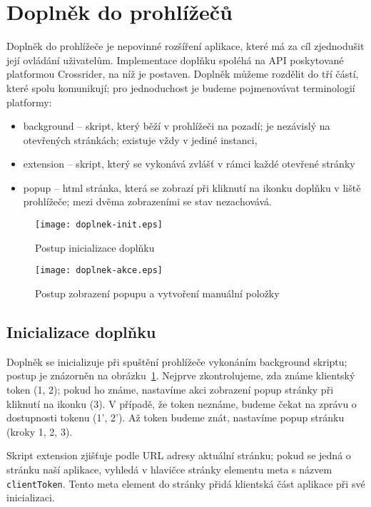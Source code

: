 \section{Doplněk do prohlížečů}

Doplněk do prohlížeče je nepovinné rozšíření aplikace, které má za cíl zjednodušit její ovládání uživatelům.
Implementace doplňku spoléhá na API poskytované platformou Crossrider, na níž je postaven.
Doplněk můžeme rozdělit do tří částí, které spolu komunikují; pro jednoduchost je budeme pojmenovávat terminologií platformy:
\begin{itemize}
	\item background -- skript, který běží v prohlížeči na pozadí; je nezávislý na otevřených stránkách; existuje vždy v jediné instanci,
	\item extension -- skript, který se vykonává zvlášť v rámci každé otevřené stránky
	\item popup -- html stránka, která se zobrazí při kliknutí na ikonku doplňku v liště prohlížeče; mezi dvěma zobrazeními se stav nezachovává.
\end{itemize}

\begin{figure}
	\centering
	\texttt{[image: doplnek-init.eps]}
	\caption{Postup inicializace doplňku}
	\label{fig:doplnek-init}
\end{figure}
\begin{figure}
	\centering
	\texttt{[image: doplnek-akce.eps]}
	\caption{Postup zobrazení popupu a vytvoření manuální položky}
	\label{fig:doplnek-akce}
\end{figure}

\subsection{Inicializace doplňku}

Doplněk se inicializuje při spuštění prohlížeče vykonáním background skriptu; postup je znázorněn na obrázku~\ref{fig:doplnek-init}.
Nejprve zkontrolujeme, zda známe klientský token (1, 2); pokud ho známe, nastavíme akci zobrazení popup stránky při kliknutí na ikonku (3).
V případě, že token neznáme, budeme čekat na zprávu o dostupnosti tokenu (1', 2').
Až token budeme znát, nastavíme popup stránku (kroky 1, 2, 3).

Skript extension zjišťuje podle URL adresy aktuální stránku; pokud se jedná o stránku naší aplikace, vyhledá v hlavičce stránky elementu meta s názvem \verb|clientToken|.
Tento meta element do stránky přidá klientská část aplikace při své inicializaci.

